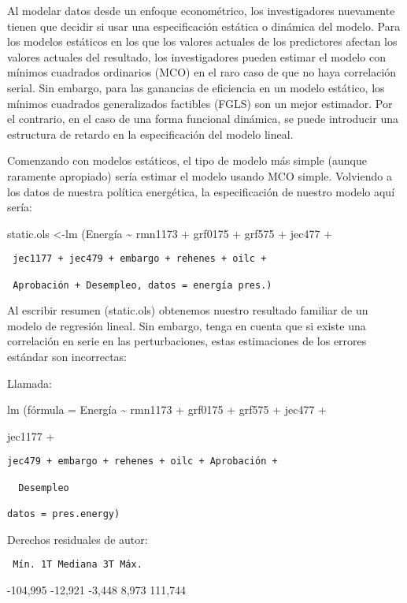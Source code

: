 \documentclass[
]{book}
\begin{document}
Al modelar datos desde un enfoque econométrico, los investigadores nuevamente tienen que decidir si usar una especificación estática o dinámica del modelo. Para los modelos estáticos en los que los valores actuales de los predictores afectan los valores actuales del resultado, los investigadores pueden estimar el modelo con mínimos cuadrados ordinarios (MCO) en el raro caso de que no haya correlación serial. Sin embargo, para las ganancias de eficiencia en un modelo estático, los mínimos cuadrados generalizados factibles (FGLS) son un mejor estimador. Por el contrario, en el caso de una forma funcional dinámica, se puede introducir una estructura de retardo en la especificación del modelo lineal.

Comenzando con modelos estáticos, el tipo de modelo más simple (aunque raramente apropiado) sería estimar el modelo usando MCO simple. Volviendo a los datos de nuestra política energética, la especificación de nuestro modelo aquí sería:

static.ols \textless-lm (Energía \textasciitilde{} rmn1173 + grf0175 + grf575 + jec477 +

\begin{verbatim}
 jec1177 + jec479 + embargo + rehenes + oilc +

 Aprobación + Desempleo, datos = energía pres.)
\end{verbatim}

Al escribir resumen (static.ols) obtenemos nuestro resultado familiar de un modelo de regresión lineal. Sin embargo, tenga en cuenta que si existe una correlación en serie en las perturbaciones, estas estimaciones de los errores estándar son incorrectas:

Llamada:

lm (fórmula = Energía \textasciitilde{} rmn1173 + grf0175 + grf575 + jec477 +

jec1177 +

\begin{verbatim}
jec479 + embargo + rehenes + oilc + Aprobación +

  Desempleo

datos = pres.energy)
\end{verbatim}

Derechos residuales de autor:

\begin{verbatim}
 Mín. 1T Mediana 3T Máx.
\end{verbatim}

-104,995 -12,921 -3,448 8,973 111,744
\end{document}
